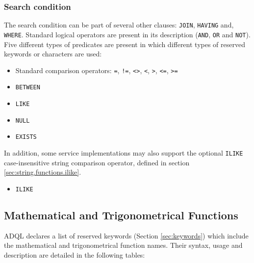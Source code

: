 \documentclass[11pt,a4paper]{ivoa}
\begin{document}

\subsubsection{Search condition}
\label{sec:search}

The search condition can be part of several other clauses: \verb:JOIN:, \verb:HAVING: and,
\verb:WHERE:. Standard logical operators are present in its description
(\verb:AND:, \verb:OR: and \verb:NOT:). Five different types of predicates are present in which
different types of reserved keywords or characters are used:

\begin{itemize}
    \item Standard comparison operators: \verb:=:, \verb:!=:, \verb:<>:, \verb:<:, \verb:>:, \verb:<=:, \verb:>=:
    \item \verb:BETWEEN:
    \item \verb:LIKE:
    \item \verb:NULL:
    \item \verb:EXISTS:
\end{itemize}

In addition, some service implementations may also support the optional
\verb:ILIKE: case-insensitive string comparison operator, defined in section \ref{sec:string.functions.ilike}.

\begin{itemize}
    \item \verb:ILIKE:
\end{itemize}

\clearpage
\subsection{Mathematical and Trigonometrical Functions}
\label{sec:math.functions}

ADQL declares a list of reserved keywords (Section \ref{sec:keywords}) which include
the mathematical and trigonometrical function names. Their syntax,
usage and description are detailed in the following tables:
\end{document}
